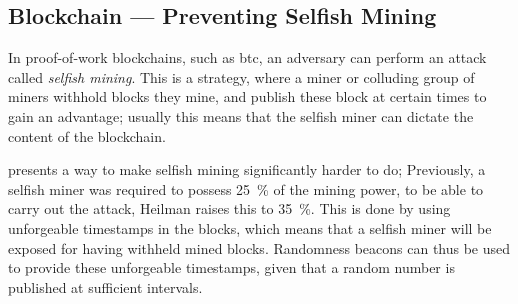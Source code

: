 \subsection{Blockchain --- Preventing Selfish Mining}\label{sub:blockchain_preventing_selfish_mining}
In proof-of-work blockchains, such as \gls{btc}, an adversary can perform an attack called \emph{selfish mining}.
This is a strategy, where a miner or colluding group of miners withhold blocks they mine, and publish these block at certain times to gain an advantage;
usually this means that the selfish miner can dictate the content of the blockchain.

\citet{heilman2014one} presents a way to make selfish mining significantly harder to do;
Previously, a selfish miner was required to possess 25~\% of the mining power, to be able to carry out the attack, Heilman raises this to 35~\%.
This is done by using unforgeable timestamps in the blocks, which means that a selfish miner will be exposed for having withheld mined blocks.
Randomness beacons can thus be used to provide these unforgeable timestamps, given that a random number is published at sufficient intervals.

